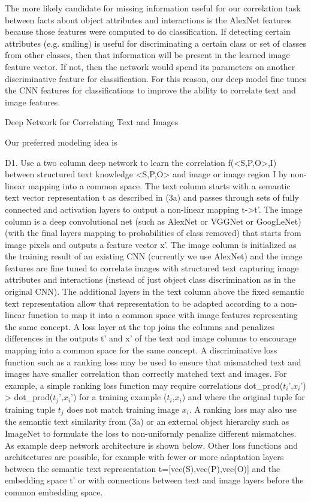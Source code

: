 \documentclass[runningheads]{llncs}
\begin{document}
The more likely candidate for missing information useful for our correlation task between facts about object attributes and interactions is the AlexNet features because those features were computed to do classification. If detecting certain attributes (e.g. smiling) is useful for discriminating a certain class or set of classes from other classes, then that information will be present in the learned image feature vector. If not, then the network would spend its parameters on another discriminative feature for classification. For this reason, our deep model fine tunes the CNN features for classifications to improve the ability to correlate text and image features.


Deep Network for Correlating Text and Images


Our preferred modeling idea is


D1. Use a two column deep network to learn the correlation f(<S,P,O>,I) between structured text knowledge <S,P,O> and image or image region I by non-linear mapping into a common space.
The text column starts with a semantic text vector representation t as described in (3a) and passes through sets of fully connected and activation layers to output a non-linear mapping t->t’.
The image column is a deep convolutional net (such as AlexNet or VGGNet or GoogLeNet) (with the final layers mapping to probabilities of class removed) that starts from image pixels and outputs a feature vector x’. The image column is initialized as the training result of an existing CNN (currently we use AlexNet) and the image features are fine tuned to correlate images with structured text capturing image attributes and interactions (instead of just object class discrimination as in the original CNN).
The additional layers in the text column above the fixed semantic text representation allow that representation to be adapted according to a non-linear function to map it into a common space with image features representing the same concept.
A loss layer at the top joins the columns and penalizes differences in the outputs t’ and x’ of the text and image columns to encourage mapping into a common space for the same concept. A discriminative loss function such as a ranking loss may be used to ensure that mismatched text and images have smaller correlation than correctly matched text and images. For example, a simple ranking loss function may require correlations dot\_prod($t_i’$,$x_i’$) > dot\_prod($t_j’$,$x_i’$) for a training example ($t_i$,$x_i$) and where the original tuple for training tuple $t_j$ does not match training image $x_i$. A ranking loss may also use the semantic text similarity from (3a) or an external object hierarchy such as ImageNet to formulate the loss to non-uniformly penalize different mismatches.
As example deep network architecture is shown below. Other loss functions and architectures are possible, for example with fewer or more adaptation layers between the semantic text representation t=[vec(S),vec(P),vec(O)] and the embedding space t’ or with connections between text and image layers before the common embedding space.
\end{document}
